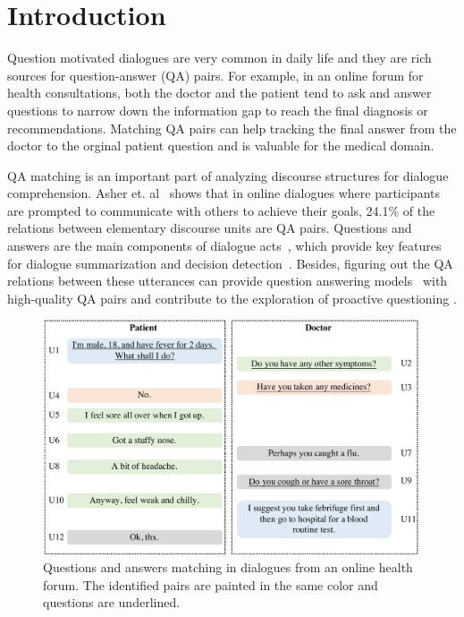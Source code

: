 \section{Introduction}
\label{sec:intro}
Question motivated dialogues are very common in daily life and 
they are rich sources for question-answer (QA) pairs. 
For example, in an online forum for health consultations, 
both the doctor and the patient tend to ask and answer questions to 
narrow down the information gap to reach the final diagnosis or 
recommendations. Matching QA pairs can help tracking the final answer from the doctor
to the orginal patient question and is valuable for the medical
domain.

QA matching is an important part of analyzing discourse structures 
for dialogue comprehension. Asher et. al~\cite{asher2016discourse} 
shows that in online dialogues where participants are prompted to 
communicate with others to achieve their goals, 24.1\% of the relations 
between elementary discourse units are QA pairs. 
Questions and answers are the main components of 
dialogue acts~\cite{stolcke2000dialogue}, which provide key features for 
dialogue summarization and decision detection~\cite{fernandez2008modelling}. 
Besides, figuring out the QA relations between these utterances can 
provide question answering 
models~\cite{ji2014information,vinyals2015neural,cui2017superagent} with 
high-quality QA pairs and contribute to the exploration of proactive questioning \cite{yan2017building}.

\begin{figure}[t]
	\centering
	\includegraphics[scale=0.29]{pictures/figure3.pdf}
	\caption{Questions and answers matching in dialogues from an online health forum. The identified pairs are painted in the same color and questions are underlined.}
	\label{fig:sample}
\end{figure}

